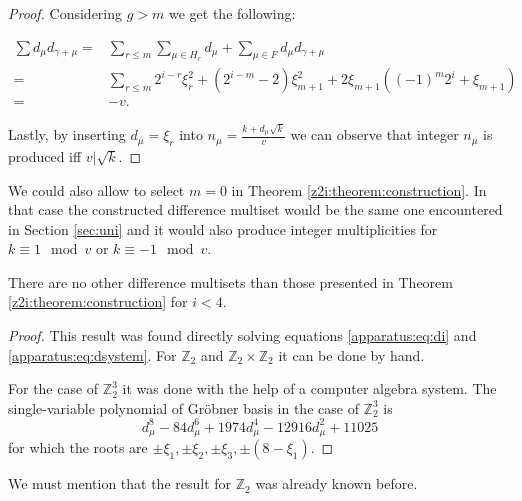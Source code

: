 \begin{proof}
    Considering $g > m$ we get the following:
    
    \begin{equation}
        \begin{split}
            \sum d_\mu d_{\gamma+\mu}
              = & \sum\limits_{r \leq m} \sum\limits_{\mu \in H_r} d_\mu
                + \sum\limits_{\mu \in F} d_\mu d_{\gamma + \mu} \\
              = & \sum\limits_{r\leq m} 2^{i-r} \xi_r^2
                + (2^{i-m}-2) \xi_{m+1}^2 + 2\xi_{m+1}((-1)^m 2^i + \xi_{m+1}) \\
              = & -v.
        \end{split}
    \end{equation}
    
    Lastly, by inserting $d_\mu = \xi_r$ into $n_\mu=\frac{k+d_\mu \sqrt k}v$ we can observe that integer $n_\mu$ is produced iff $v | \sqrt k$.
\end{proof}

\begin{remark}
    We could also allow to select $m=0$ in Theorem \ref{z2i:theorem:construction}. In that case the constructed difference multiset would be the same one encountered in Section \ref{sec:uni} and it would also produce  integer multiplicities for $k \equiv 1 \mod v$ or $k \equiv -1 \mod v$.
\end{remark}

\begin{theorem}
    There are no other difference multisets than those presented in Theorem \ref{z2i:theorem:construction} for $i < 4$.
\end{theorem}

\begin{proof}
    This result was found directly solving equations \eqref{apparatus:eq:di} and \eqref{apparatus:eq:dsystem}. For $\mathbb Z_2$ and $\mathbb Z_2 \times \mathbb Z_2$ it can be done by hand.
    
    For the case of $\mathbb Z_2^3$ it was done with the help of a computer algebra system. The single-variable polynomial of Gröbner basis in the case of $\mathbb Z_2^3$ is
    \begin{equation}
        d_\mu^8 - 84 d_\mu^6 + 1974 d_\mu^4 - 12916 d_\mu^2 + 11025
    \end{equation}
    for which the roots are $\pm\xi_1, \pm\xi_2, \pm\xi_3, \pm(8-\xi_1)$.
\end{proof}

We must mention that the result for $\mathbb Z_2$ was already known before\cite{buratti1999old}.

